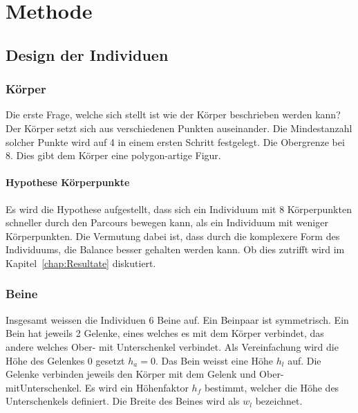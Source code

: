 %
%


\chapter{Methode}

  \section{Design der Individuen}

    \subsection{Körper\label{sub:Körper}}

      Die erste Frage, welche sich stellt ist wie der Körper beschrieben werden kann?
      \\
      Der Körper setzt sich aus verschiedenen Punkten auseinander.
      Die Mindestanzahl solcher Punkte wird auf 4 in einem ersten Schritt festgelegt.
      Die Obergrenze bei 8.
      Dies gibt dem Körper eine polygon-artige Figur.

      \subsubsection{Hypothese Körperpunkte\label{subsub:hypoKp}}

        Es wird die Hypothese aufgestellt,
        dass sich ein Individuum mit 8 Körperpunkten schneller durch den Parcours bewegen kann,
        als ein Individuum mit weniger Körperpunkten.
        Die Vermutung dabei ist, dass durch die komplexere Form des Individuums,
        die Balance besser gehalten werden kann.
        Ob dies zutrifft wird im Kapitel~\ref{chap:Resultate} diskutiert.

    \subsection{Beine\label{sub:Beine}}

      Insgesamt weissen die Individuen 6 Beine auf.
      Ein Beinpaar ist symmetrisch.
      Ein Bein hat jeweils 2 Gelenke, eines welches es mit dem Körper verbindet,
      das andere welches Ober- mit Unterschenkel verbindet.
      Als Vereinfachung wird die Höhe des Gelenkes 0 gesetzt \(h_{a} = 0\).
      Das Bein weisst eine Höhe \(h_{l}\) auf.
      Die Gelenke verbinden jeweils den Körper mit dem Gelenk und Ober- mitUnterschenkel.
      Es wird ein Höhenfaktor \(h_f\) bestimmt, welcher die Höhe des Unterschenkels definiert.
      Die Breite des Beines wird als \(w_{l}\) bezeichnet.

